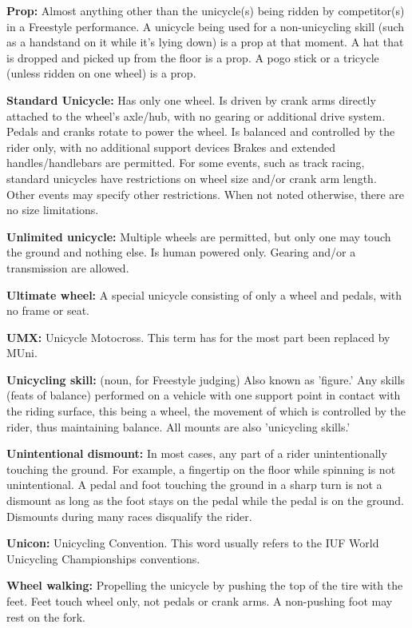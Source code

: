 \textbf{Prop:} Almost anything other than the unicycle(s) being ridden by competitor(s) in a Freestyle performance.
A unicycle being used for a non-unicycling skill (such as a handstand on it while it's lying down) is a prop at that moment.
A hat that is dropped and picked up from the floor is a prop.
A pogo stick or a tricycle (unless ridden on one wheel) is a prop.

\textbf{Standard Unicycle:} Has only one wheel.
Is driven by crank arms directly attached to the wheel's axle/hub, with no gearing or additional drive system.
Pedals and cranks rotate to power the wheel.
Is balanced and controlled by the rider only, with no additional support devices Brakes and extended handles/handlebars are permitted.
For some events, such as track racing, standard unicycles have restrictions on wheel size and/or crank arm length.
Other events may specify other restrictions.
When not noted otherwise, there are no size limitations.

\textbf{Unlimited unicycle:} Multiple wheels are permitted, but only one may touch the ground and nothing else.
Is human powered only.
Gearing and/or a transmission are allowed.

\textbf{Ultimate wheel:} A special unicycle consisting of only a wheel and pedals, with no frame or seat.

\textbf{UMX:} Unicycle Motocross.
This term has for the most part been replaced by MUni.

\textbf{Unicycling skill:} (noun, for Freestyle judging) Also known as 'figure.' Any skills (feats of balance) performed on a vehicle with one support point in contact with the riding surface, this being a wheel, the movement of which is controlled by the rider, thus maintaining balance.
All mounts are also 'unicycling skills.' 

\textbf{Unintentional dismount:} In most cases, any part of a rider unintentionally touching the ground.
For example, a fingertip on the floor while spinning is not unintentional.
A pedal and foot touching the ground in a sharp turn is not a dismount as long as the foot stays on the pedal while the pedal is on the ground.
Dismounts during many races disqualify the rider.

\textbf{Unicon:} Unicycling Convention.
This word usually refers to the IUF World Unicycling Championships conventions.

\textbf{Wheel walking:} Propelling the unicycle by pushing the top of the tire with the feet.
Feet touch wheel only, not pedals or crank arms.
A non-pushing foot may rest on the fork.


